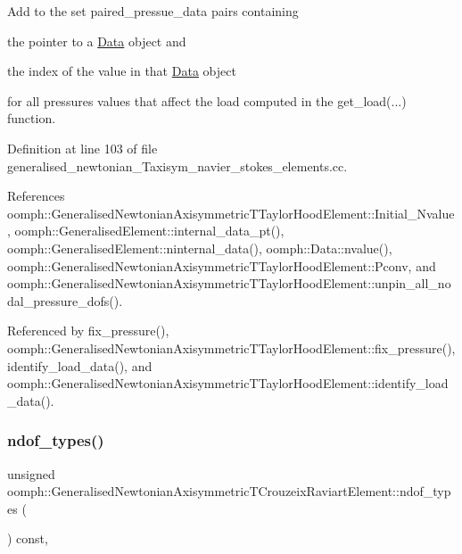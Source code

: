 Add to the set {\ttfamily paired\+\_\+pressue\+\_\+data} pairs containing
\begin{DoxyItemize}
\item the pointer to a \hyperlink{classoomph_1_1Data}{Data} object and
\item the index of the value in that \hyperlink{classoomph_1_1Data}{Data} object
\end{DoxyItemize}for all pressures values that affect the load computed in the {\ttfamily get\+\_\+load}(...) function. 

Definition at line 103 of file generalised\+\_\+newtonian\+\_\+\+Taxisym\+\_\+navier\+\_\+stokes\+\_\+elements.\+cc.



References oomph\+::\+Generalised\+Newtonian\+Axisymmetric\+T\+Taylor\+Hood\+Element\+::\+Initial\+\_\+\+Nvalue, oomph\+::\+Generalised\+Element\+::internal\+\_\+data\+\_\+pt(), oomph\+::\+Generalised\+Element\+::ninternal\+\_\+data(), oomph\+::\+Data\+::nvalue(), oomph\+::\+Generalised\+Newtonian\+Axisymmetric\+T\+Taylor\+Hood\+Element\+::\+Pconv, and oomph\+::\+Generalised\+Newtonian\+Axisymmetric\+T\+Taylor\+Hood\+Element\+::unpin\+\_\+all\+\_\+nodal\+\_\+pressure\+\_\+dofs().



Referenced by fix\+\_\+pressure(), oomph\+::\+Generalised\+Newtonian\+Axisymmetric\+T\+Taylor\+Hood\+Element\+::fix\+\_\+pressure(), identify\+\_\+load\+\_\+data(), and oomph\+::\+Generalised\+Newtonian\+Axisymmetric\+T\+Taylor\+Hood\+Element\+::identify\+\_\+load\+\_\+data().

\mbox{\label{classoomph_1_1GeneralisedNewtonianAxisymmetricTCrouzeixRaviartElement_a887f4ea8bcd6775f6b19d326409a8bd2}} 
\subsubsection{\texorpdfstring{ndof\+\_\+types()}{ndof\_types()}}
{\footnotesize\ttfamily unsigned oomph\+::\+Generalised\+Newtonian\+Axisymmetric\+T\+Crouzeix\+Raviart\+Element\+::ndof\+\_\+types (\begin{DoxyParamCaption}{ }\end{DoxyParamCaption}) const\hspace{0.3cm}{\ttfamily [inline]}, {\ttfamily [virtual]}}



